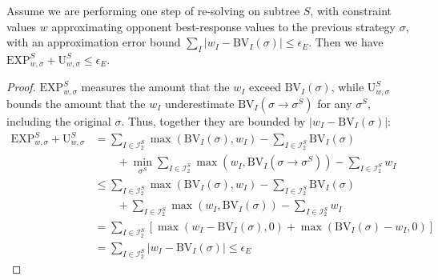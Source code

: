 \begin{lemma}
  Assume we are performing one step of re-solving on subtree $S$, with
  constraint values $w$ approximating opponent best-response values to
  the previous strategy $\sigma$, with an approximation error bound
  $\sum_I |w_I-\text{BV}_I(\sigma)| \le \epsilon_E$. Then we have
  $\text{EXP}^S_{w,\sigma} + \text{U}^S_{w,\sigma} \le \epsilon_E$.
  \label{lem:resolve_step}
\end{lemma}
\begin{proof}
  $\text{EXP}^S_{w,\sigma}$ measures the amount that the $w_I$ exceed $\text{BV}_I(\sigma)$, while $\text{U}^S_{w,\sigma}$ bounds the amount that the $w_I$ underestimate $\text{BV}_I(\sigma\to\sigma^S)$ for any $\sigma^S$, including the original $\sigma$. Thus, together they are bounded by $|w_I-\text{BV}_I(\sigma)|$:
  \begin{align*}
    \text{EXP}^S_{w,\sigma} + \text{U}^S_{w,\sigma} &= \sum_{I \in \mathcal{I}^S_2} \max( \text{BV}_I( \sigma ), w_I ) -
  \sum_{I \in \mathcal{I}^S_2} \text{BV}_I( \sigma )\\
    &\qquad+ \min_{\sigma^S} \sum_{I \in \mathcal{I}^S_2} \max(w_I,\text{BV}_I(\sigma\to\sigma^S)) - \sum_{I \in \mathcal{I}^S_2}w_I\\
    &\leq \sum_{I \in \mathcal{I}^S_2} \max( \text{BV}_I( \sigma ), w_I ) - \sum_{I \in \mathcal{I}^S_2} \text{BV}_I( \sigma )\\
    &\qquad + \sum_{I \in \mathcal{I}^S_2} \max(w_I,\text{BV}_I(\sigma)) - \sum_{I \in \mathcal{I}^S_2}w_I\\
    &= \sum_{I \in \mathcal{I}^S_2} \left[\max(w_I - \text{BV}_I(\sigma),0) + \max(\text{BV}_I(\sigma)-w_I,0)\right]\\
    &= \sum_{I \in \mathcal{I}^S_2} |w_I - \text{BV}_I(\sigma)| \leq \epsilon_E
  \end{align*}
\end{proof}

